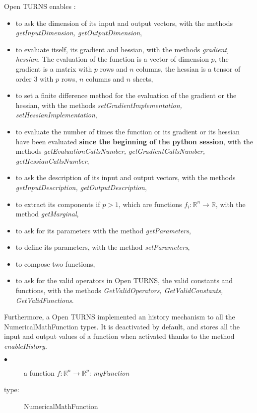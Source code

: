 Open TURNS enables :
\begin{itemize}
\item to ask the dimension of its input and output vectors, with the methods {\itshape getInputDimension,  getOutputDimension},
\item to evaluate itself, its gradient and hessian, with the methods {\itshape gradient, hessian}. The evaluation of the function is a vector of dimension $p$, the gradient is a matrix with $p$ rows and $n$ columns, the hessian is a tensor of order 3 with  $p$ rows, $n$ columns and $n$ sheets,
\item to set a finite difference method for the evaluation of the gradient or the hessian, with the methods {\itshape setGradientImplementation, setHessianImplementation},
\item to evaluate the number of times the function or its gradient or its hessian have been evaluated {\bf since the beginning of the python session}, with the methods {\itshape getEvaluationCallsNumber, getGradientCallsNumber, getHessianCallsNumber},
\item to ask the description of its input and output vectors, with the methods {\itshape getInputDescription,  getOutputDescription},
\item to extract its components if $p>1$, which are functions $f_i : \mathbb{R}^n  \longrightarrow \mathbb{R}$, with the method {\itshape getMarginal},
\item to ask for its parameters with the method {\itshape getParameters},
\item to define its parameters, with the method {\itshape setParameters},
\item to compose two functions,
\item to ask for the valid operators in Open TURNS, the valid constants and functions, with the methods {\itshape GetValidOperators, GetValidConstants, GetValidFunctions}.
\end{itemize}

Furthermore, a Open TURNS implemented an history mechanism to all the NumericalMathFunction types. It is deactivated by default, and stores all the input and output values of a function when activated thanks to the method  {\itshape enableHistory}.

{
  \begin{description}
  \item[$\bullet$] a function $f : \mathbb{R}^n  \longrightarrow \mathbb{R}^p$: {\itshape myFunction}
  \item[type:] NumericalMathFunction
  \end{description}
}

